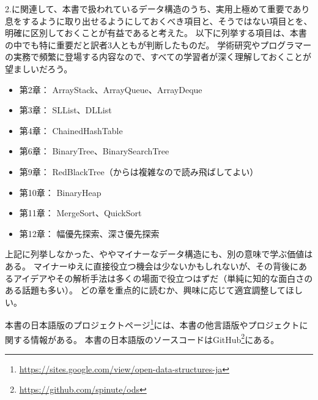 2.に関連して、本書で扱われているデータ構造のうち、実用上極めて重要であり息をするように取り出せるようにしておくべき項目と、そうではない項目とを、明確に区別しておくことが有益であると考えた。
以下に列挙する項目は、本書の中でも特に重要だと訳者3人ともが判断したものだ。
学術研究やプログラマーの実務で頻繁に登場する内容なので、すべての学習者が深く理解しておくことが望ましいだろう。

\begin{itemize}
  \item 第2章： ArrayStack、ArrayQueue、ArrayDeque
  \item 第3章： SLList、DLList
  \item 第4章： ChainedHashTable
  \item 第6章： BinaryTree、BinarySearchTree
  \item 第9章： RedBlackTree（からは複雑なので読み飛ばしてよい）
  \item 第10章： BinaryHeap
  \item 第11章： MergeSort、QuickSort
  \item 第12章： 幅優先探索、深さ優先探索
\end{itemize}

上記に列挙しなかった、ややマイナーなデータ構造にも、別の意味で学ぶ価値はある。
マイナーゆえに直接役立つ機会は少ないかもしれないが、その背後にあるアイデアやその解析手法は多くの場面で役立つはずだ（単純に知的な面白さのある話題も多い）。
どの章を重点的に読むか、興味に応じて適宜調整してほしい。

本書の日本語版のプロジェクトページ\footnote {\url{https://sites.google.com/view/open-data-structures-ja}}には、本書の他言語版やプロジェクトに関する情報がある。
本書の日本語版のソースコードはGitHub\footnote {\url{https://github.com/spinute/ods}}にある。

